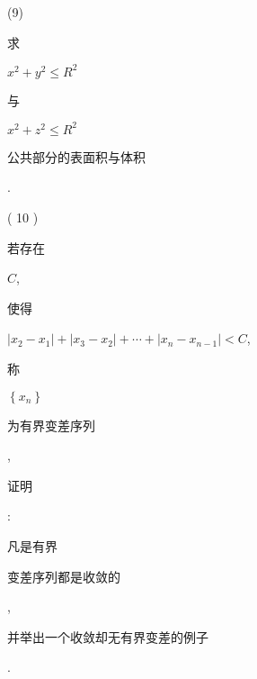 \documentclass[10pt]{article}
\begin{document}
(9) \begin{CJK}{UTF8}{mj}求\end{CJK} $x^{2}+y^{2} \leqslant R^{2}$ \begin{CJK}{UTF8}{mj}与\end{CJK} $x^{2}+z^{2} \leqslant R^{2}$ \begin{CJK}{UTF8}{mj}公共部分的表面积与体积\end{CJK}.

( 10 ) \begin{CJK}{UTF8}{mj}若存在\end{CJK} $C$, \begin{CJK}{UTF8}{mj}使得\end{CJK} $\left|x_{2}-x_{1}\right|+\left|x_{3}-x_{2}\right|+\cdots+\left|x_{n}-x_{n-1}\right|<C$, \begin{CJK}{UTF8}{mj}称\end{CJK} $\left\{x_{n}\right\}$ \begin{CJK}{UTF8}{mj}为有界变差序列\end{CJK}, \begin{CJK}{UTF8}{mj}证明\end{CJK}: \begin{CJK}{UTF8}{mj}凡是有界\end{CJK} \begin{CJK}{UTF8}{mj}变差序列都是收敛的\end{CJK}, \begin{CJK}{UTF8}{mj}并举出一个收敛却无有界变差的例子\end{CJK}.
\end{document}

